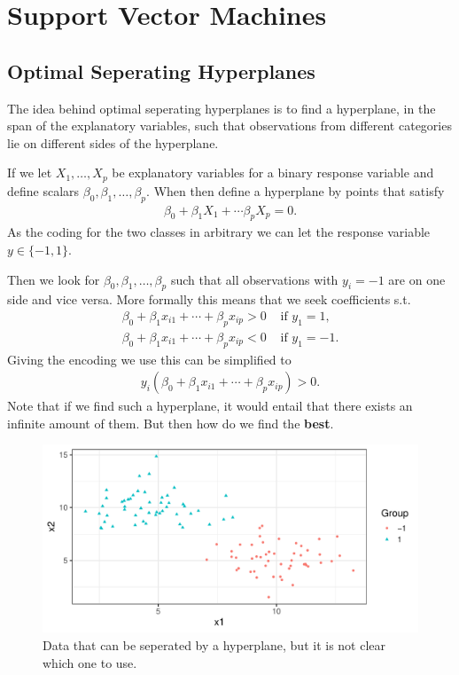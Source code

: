 \documentclass[aspectratio=169,10pt]{beamer}
\begin{document}
\section{Support Vector Machines}

\subsection{Optimal Seperating Hyperplanes}
\begin{frame}{\secname}{\subsecname}
  The idea behind optimal seperating hyperplanes is to find a hyperplane, in the span of the explanatory variables, such that observations from different categories lie on different sides of the hyperplane.

  If we let $X_1, \ldots, X_p$ be explanatory variables for a binary response variable and define scalars $\beta_0, \beta_1, \ldots, \beta_p$.
  When then define a hyperplane by points that satisfy
  \begin{align}
    \beta_0 + \beta_1 X_1 + \cdots \beta_pX_p = 0. 
  \end{align}
  As the coding for the two classes in arbitrary we can let the response variable $y \in \{-1,1\}$.
\end{frame}

\begin{frame}{\secname}{\subsecname}
  Then we look for $\beta_0, \beta_1, \ldots, \beta_p$ such that all observations with $y_i = -1$ are on one side and vice versa.
  More formally this means that we seek coefficients s.t.
  \begin{align}
    \beta_0 + \beta_1x_{i1} + \cdots + \beta_p x_{ip} > 0 &\text{ if } y_1 = 1, \\
    \beta_0 + \beta_1x_{i1} + \cdots + \beta_p x_{ip} < 0 &\text{ if } y_1 = -1. 
  \end{align}
  Giving the encoding we use this can be simplified to
  \begin{align}
    y_i \left(\beta_0 + \beta_1 x_{i1} + \cdots + \beta_p x_{ip}\right) > 0. 
  \end{align}
  Note that if we find such a hyperplane, it would entail that there exists an infinite amount of them.
  But then how do we find the \textbf{best}.
\end{frame}

\begin{frame}{\secname}{\subsecname}
  \begin{figure}
    \includegraphics[width=.7\textwidth]{scripts/output/osh_data.pdf}
    \caption{Data that can be seperated by a hyperplane, but it is not clear which one to use.}
  \end{figure}
\end{frame}
\end{document}
